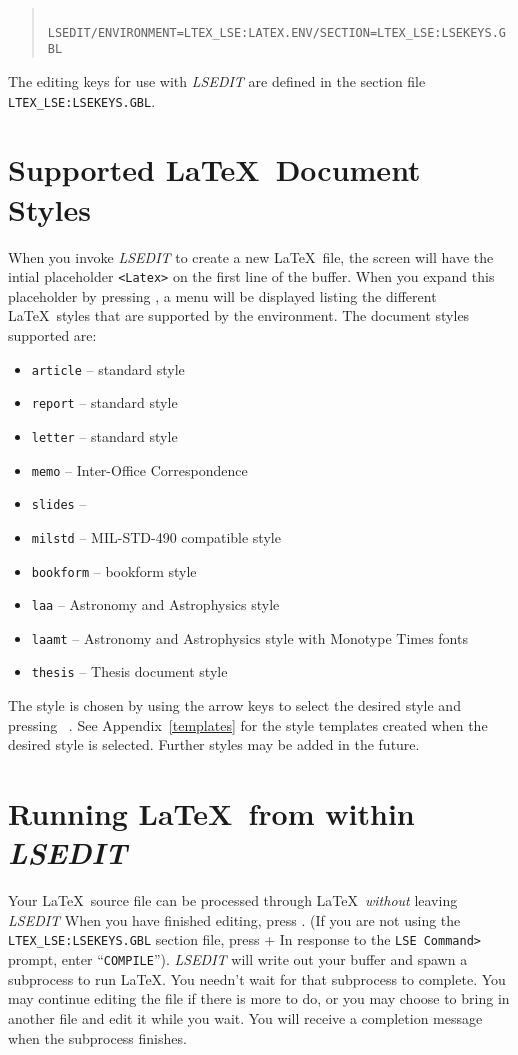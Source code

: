 \begin{quote}
\tt
LSEDIT/ENVIRONMENT=LTEX\_LSE:LATEX.ENV/SECTION=LTEX\_LSE:LSEKEYS.GBL \hfill
\end{quote}

The editing keys for use with {\sl LSEDIT\/} are defined in the
section file {\tt LTEX\_LSE:LSEKEYS.GBL}.

\section{Supported \LaTeX\ Document Styles}

When you invoke {\sl LSEDIT\/} to create a new \LaTeX\ file, the screen will
have the intial placeholder \verb"<Latex>" on the first line of the buffer.
When you expand this placeholder by pressing , a menu will be displayed
listing the different \LaTeX\ styles that are supported by the environment.
The document styles supported are:

\begin{itemize}
\item {\tt article} -- standard style
\item {\tt report} -- standard style
\item {\tt letter} -- standard style
\item {\tt memo} -- Inter-Office Correspondence
\item {\tt slides} -- \SLiTeX{}
\item {\tt milstd} -- MIL-STD-490 compatible style
\item {\tt bookform} -- bookform style
\item {\tt laa} -- Astronomy and Astrophysics style
\item {\tt laamt} -- Astronomy and Astrophysics style with Monotype Times fonts
\item {\tt thesis} -- Thesis document style
\end{itemize}

The style is chosen by using the arrow keys to select the desired style and
pressing \mbox{ \return.} See Appendix~\ref{templates} for the style templates
created when the desired style is selected. Further styles may be added in the
future.

\section{Running \LaTeX\ from within {\sl LSEDIT\/}}

Your \LaTeX\ source file can be processed through \LaTeX\ {\em without\/}
leaving {\sl LSEDIT\/} When you have finished editing, press . (If
you are not using the {\tt LTEX\_LSE:LSEKEYS.GBL} section  file, press \gold +
 In response to the \verb"LSE Command>" prompt, enter ``{\tt COMPILE}'').
{\sl LSEDIT\/} will write out your buffer and spawn a subprocess to run \LaTeX.
You needn't wait for that subprocess to complete. You may continue editing the
file if there is more to do, or you may choose to bring in another file and
edit it while you wait. You will receive a completion message when the
subprocess finishes.


